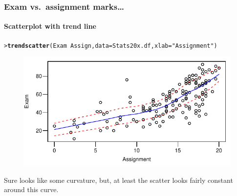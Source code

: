 \documentclass{beamer}\usepackage[]{graphicx}\usepackage[]{xcolor}
\makeatletter
\newcommand{\hlstr}[1]{\textcolor[rgb]{0.192,0.494,0.8}{#1}}%
\newcommand{\hlopt}[1]{\textcolor[rgb]{0,0,0}{#1}}%
\newcommand{\hlstd}[1]{\textcolor[rgb]{0.345,0.345,0.345}{#1}}%
\newcommand{\hlkwc}[1]{\textcolor[rgb]{0.333,0.667,0.333}{#1}}%
\newcommand{\hlkwd}[1]{\textcolor[rgb]{0.737,0.353,0.396}{\textbf{#1}}}%
\newenvironment{kframe}{%
 \def\at@end@of@kframe{}%
 \ifinner\ifhmode%
  \def\at@end@of@kframe{\end{minipage}}%
  \begin{minipage}{\columnwidth}%
 \fi\fi%
 \def\FrameCommand##1{\hskip\@totalleftmargin \hskip-\fboxsep
 \colorbox{shadecolor}{##1}\hskip-\fboxsep
     \hskip-\linewidth \hskip-\@totalleftmargin \hskip\columnwidth}%
 \MakeFramed {\advance\hsize-\width
   \@totalleftmargin\z@ \linewidth\hsize
   \@setminipage}}%
 {\par\unskip\endMakeFramed%
 \at@end@of@kframe}
\newenvironment{knitrout}{}{} %
\makeatother
\begin{document}
\begin{frame}[fragile]
\frametitle{Exam vs.\ assignment marks\ldots}
\framesubtitle{Scatterplot with trend line}

\begin{knitrout}\scriptsize
{}\color{fgcolor}\begin{kframe}
\begin{alltt}
\hlstd{> }\hlkwd{trendscatter}\hlstd{(Exam} \hlopt{~} \hlstd{Assign,} \hlkwc{data} \hlstd{= Stats20x.df,}\hlkwc{xlab}\hlstd{=}\hlstr{"Assignment"}\hlstd{)}
\end{alltt}
\end{kframe}
\end{knitrout}



\begin{figure}
  \centering
  \includegraphics{figure/RC-H04-004}
\end{figure}

Sure looks like some curvature, but, at least the scatter looks fairly constant around this curve.

\end{frame}
\end{document}
